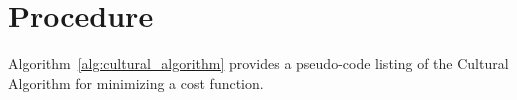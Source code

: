 \documentclass[a4paper, 11pt]{article}
\begin{document}
\section{Procedure}
\label{sec:procedure}
Algorithm~\ref{alg:cultural_algorithm} provides a pseudo-code listing of the Cultural Algorithm for minimizing a cost function. 
\end{document}
